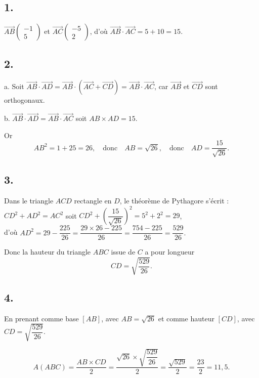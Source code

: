 \subsection*{1.}
	
	\(\overrightarrow{AB} \left( \begin{array}{c} -1 \\ 5 \end{array} \right)\) et \(\overrightarrow{AC} \left( \begin{array}{c} -5 \\ 2 \end{array} \right)\), d’où \(\overrightarrow{AB} \cdot \overrightarrow{AC} = 5 + 10 = 15\).
	
	\subsection*{2.}
	
	a. Soit \(\overrightarrow{AB} \cdot \overrightarrow{AD} = \overrightarrow{AB} \cdot (\overrightarrow{AC} + \overrightarrow{CD}) = \overrightarrow{AB} \cdot \overrightarrow{AC}\), car \(\overrightarrow{AB}\) et \(\overrightarrow{CD}\) sont orthogonaux.
	
	b. \(\overrightarrow{AB} \cdot \overrightarrow{AD} = \overrightarrow{AB} \cdot \overrightarrow{AC}\) soit \(AB \times AD = 15\).
	
	Or
	\[
	AB^2 = 1 + 25 = 26, \quad \text{donc} \quad AB = \sqrt{26}, \quad \text{donc} \quad AD = \dfrac{15}{\sqrt{26}}.
	\]
	
	\subsection*{3.}
	
	Dans le triangle \(ACD\) rectangle en \(D\), le théorème de Pythagore s’écrit :\\
$
	CD^2 + AD^2 = AC^2$  soit $ CD^2 + \left(\dfrac{15}{\sqrt{26}}\right)^2 = 5^2 + 2^2 = 29$, \\
	 d’où $ AD^2 = 29 - \dfrac{225}{26} = \dfrac{29 \times 26 - 225}{26} = \dfrac{754 - 225}{26} = \dfrac{529}{26}.$
	
	Donc la hauteur du triangle \(ABC\) issue de \(C\) a pour longueur
	\[
	CD = \sqrt{\dfrac{529}{26}}.
	\]
	
	\subsection*{4.}
	
	En prenant comme base \([AB]\), avec \(AB = \sqrt{26}\) et comme hauteur \([CD]\), avec \(CD = \sqrt{\dfrac{529}{26}}\).
	
	\[
	A(ABC) = \dfrac{AB \times CD}{2} = \dfrac{\sqrt{26} \times \sqrt{\dfrac{529}{26}}}{2} = \dfrac{\sqrt{529}}{2} = \dfrac{23}{2} = 11,5.
	\]
